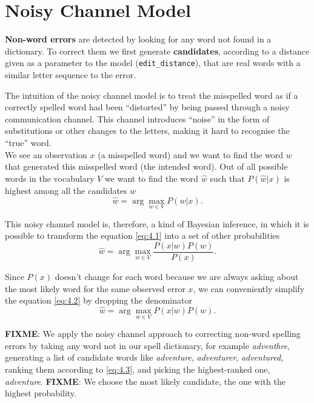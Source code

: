 \section{Noisy Channel Model}
\textbf{Non-word errors} are detected by looking for any word not found in a dictionary. To correct them we first 
generate \textbf{candidates}, according to a distance given as a parameter to the model (\texttt{edit\_distance}), 
that are 
real words with a similar letter sequence to the error. 

The intuition of the noisy channel model is to treat the misspelled word as if a correctly spelled word had 
been “distorted” by being passed through a noisy communication channel. 
This channel introduces “noise” in the form of substitutions or other changes to the letters, making it hard to 
recognise 
the “true” word. \\

We see an observation $x$ (a misspelled word) and we want to find the word $w$ that generated this misspelled 
word 
(the intended word).
Out of all possible words in the vocabulary $V$ we want to find the word $\hat{w}$ such that $P(\hat{w}|x)$ is 
highest 
among all the candidates $w$
\begin{equation}\label{eq:4.1}
	\hat{w} = \arg\max_{w \in V} P(w|x) \mbox{.}
\end{equation}

This noisy channel model is, therefore, a kind of Bayesian inference, in which it is possible to transform the 
equation 
\ref{eq:4.1} into a set of other probabilities
\begin{equation}\label{eq:4.2}
\hat{w} = \arg\max_{w \in V} \frac{P(x|w)P(w)}{P(x)} \mbox{.}
\end{equation}

Since $P(x)$ doesn’t change for each word because we are always asking about the most likely word for the same 
observed error $x$, we can conveniently simplify the equation \ref{eq:4.2} by dropping the denominator
\begin{equation}\label{eq:4.3}
\hat{w} = \arg\max_{w \in V} {P(x|w)P(w)} \mbox{.}
\end{equation}

\textbf{FIXME}: We apply the noisy channel approach to correcting non-word spelling errors by taking any word not 
in our 
spell dictionary, for example \textsl{adventhre}, generating a list of candidate words like \textsl{adventure}, 
\textsl{adventurer}, \textsl{adventured}, ranking them according to \ref{eq:4.3}, and picking the highest-ranked 
one, 
\textsl{adventure}. \textbf{FIXME}: We choose the most likely candidate, the one with the highest probability.

